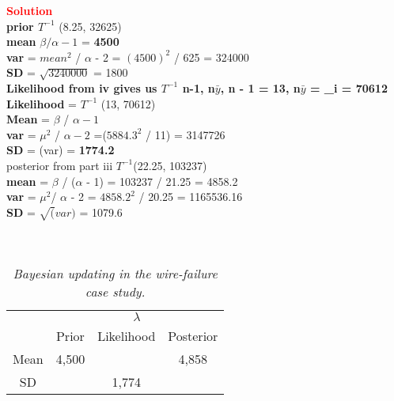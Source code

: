 \documentclass[12pt]{article}
\begin{document}
\begin{itemize}
\begin{itemize}
\begin{itemize}
\textcolor{red}{\textbf{Solution}} \\
\textbf{prior $T^{-1}$} (8.25, 32625) \\
\textbf{mean} $\beta / \alpha - 1$ = \textbf{4500} \\
\textbf{var} = $mean^{2}$ / $\alpha$ - 2 = $(4500)^{2}$ / 625 = 324000 \\
\textbf{SD} = $\sqrt{3240000}$ = 1800 \\
\textbf{Likelihood from iv gives us $T^{-1}$ n-1, n$\bar{y}$,  n - 1 = 13, n$\bar{y}$ = \sum_{i} = 70612} \\ 
\textbf{Likelihood} = $T^{-1}$ (13, 70612) \\
\textbf{Mean} = $\beta$ / $\alpha - 1$  \\
\textbf{var} = $\mu^{2}$ / $\alpha - 2$ =($5884.3^{2}$ / 11) =  3147726 \\
\textbf{SD} = \sqrt(var) = \textbf{1774.2} \\ 
{posterior from part iii} \approx $T^{-1}$(22.25, 103237) \\
\textbf{mean} = $\beta$ / ($\alpha$ - 1) = 103237 / 21.25 = 4858.2 \\
\textbf{var} = $\mu^{2}$/ $\alpha$ - 2 = $4858.2^{2}$ / 20.25 = 1165536.16 \\
\textbf{SD} = $\sqrt(var)$ = 1079.6 \\ \\ \\

\begin{table}[t!]

\centering

\caption{\textit{Bayesian updating in the wire-failure case study.}}

\label{t:prior-likelihood-posterior}

\bigskip

\begin{tabular}{c|ccc}

\multicolumn{1}{c}{} & \multicolumn{3}{c}{$\lambda$} \\ \cline{2-4}

\multicolumn{1}{c}{} & Prior & Likelihood & Posterior \\

\hline

Mean & 4,500 & & 4,858 \\

SD & & 1,774 & \\

\end{tabular}


\end{table}
\end{itemize}
\end{itemize}
\end{itemize}
\end{document}
